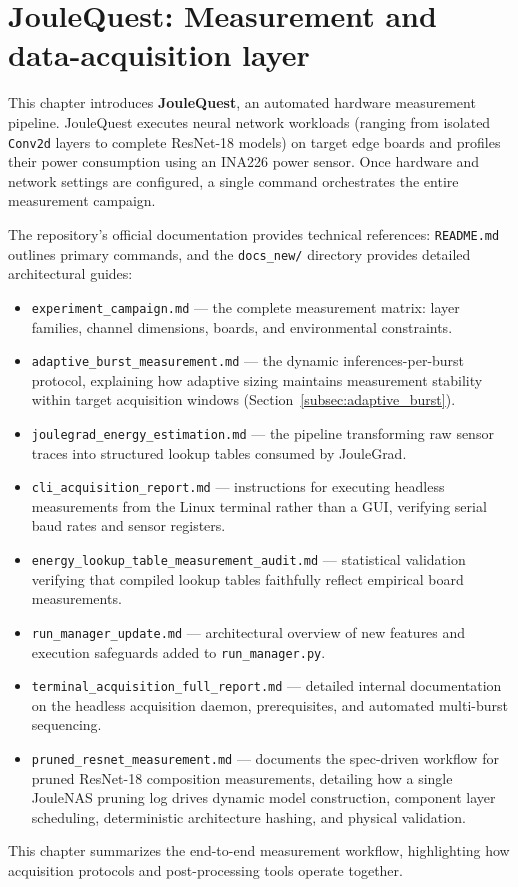\chapter{JouleQuest: Measurement and data-acquisition layer}

This chapter introduces \textbf{JouleQuest}, an automated hardware measurement pipeline. JouleQuest executes neural network workloads (ranging from isolated \texttt{Conv2d} layers to complete ResNet-18 models) on target edge boards and profiles their power consumption using an INA226 power sensor. Once hardware and network settings are configured, a single command orchestrates the entire measurement campaign.

The repository's official documentation provides technical references: \texttt{README.md} outlines primary commands, and the \texttt{docs\_new/} directory provides detailed architectural guides:
\begin{itemize}
    \item \texttt{experiment\_campaign.md} --- the complete measurement matrix: layer families, channel dimensions, boards, and environmental constraints.
    \item \texttt{adaptive\_burst\_measurement.md} --- the dynamic inferences-per-burst protocol, explaining how adaptive sizing maintains measurement stability within target acquisition windows (Section~\ref{subsec:adaptive_burst}).
    \item \texttt{joulegrad\_energy\_estimation.md} --- the pipeline transforming raw sensor traces into structured lookup tables consumed by JouleGrad.
    \item \texttt{cli\_acquisition\_report.md} --- instructions for executing headless measurements from the Linux terminal rather than a GUI, verifying serial baud rates and sensor registers.
    \item \texttt{energy\_lookup\_table\_measurement\_audit.md} --- statistical validation verifying that compiled lookup tables faithfully reflect empirical board measurements.
    \item \texttt{run\_manager\_}\allowbreak\texttt{update.md} --- architectural overview of new features and execution safeguards added to \texttt{run\_manager.py}.
    \item \texttt{terminal\_acquisition\_full\_report.md} --- detailed internal documentation on the headless acquisition daemon, prerequisites, and automated multi-burst sequencing.
    \item \texttt{pruned\_resnet\_}\allowbreak\texttt{measurement.md} --- documents the spec-driven workflow for pruned ResNet-18 composition measurements, detailing how a single JouleNAS pruning log drives dynamic model construction, component layer scheduling, deterministic architecture hashing, and physical validation.
\end{itemize}
This chapter summarizes the end-to-end measurement workflow, highlighting how acquisition protocols and post-processing tools operate together.

